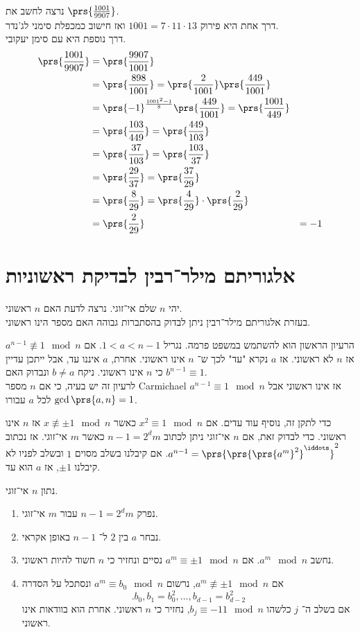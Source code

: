\documentclass[a4paper,10pt,twoside,openany]{book}
\begin{document}
\begin{example}
נרצה לחשב את
$\prs{\frac{1001}{9907}}$.\\
דרך אחת היא פירוק
$1001 = 7 \cdot 11 \cdot 13$
ואז חישוב כמכפלת סימני לג'נדר.
\\
דרך נוספת היא עם סימן יעקובי.
\begin{align*}
\prs{\frac{1001}{9907}} &= \prs{\frac{9907}{1001}} \\&= \prs{\frac{898}{1001}} =
\prs{\frac{2}{1001}}\prs{\frac{449}{1001}} \\&=
\prs{-1}^{\frac{1001^2 - 1}{8}} \prs{\frac{449}{1001}} =
\prs{\frac{1001}{449}} \\&=
\prs{\frac{103}{449}} =
\prs{\frac{449}{103}} \\&=
\prs{\frac{37}{103}} =
\prs{\frac{103}{37}} \\&=
\prs{\frac{29}{37}} =
\prs{\frac{37}{29}} \\&=
\prs{\frac{8}{29}} = \prs{\frac{4}{29}} \cdot \prs{\frac{2}{29}}\\&=
\prs{\frac{2}{29}} &= - 1
\end{align*}
\end{example}

\section{אלגוריתם מילר־רבין לבדיקת ראשוניות}

יהי
$n$
שלם אי־זוגי. נרצה לדעת האם
$n$
ראשוני.\\
בעזרת אלגוריתם מילר־רבין ניתן לבדוק בהסתברות גבוהה האם מספר הינו ראשוני.

הרעיון הראשון הוא להשתמש במשפט פרמה.
נגריל
$1 < a < n-1$.
אם
$a^{n-1} \not\equiv 1 \mod{n}$
אז
$n$
לא ראשוני.
אז
$a$
נקרא "עד" לכך ש־%
$n$
אינו ראשוני.
אחרת,
$a$
איננו עד, אבל ייתכן עדיין כי
$n$
אינו ראשוני.
ניקח
$b \neq a$
ונבדוק האם
$b^{n-1} \equiv 1$.\\
לרעיון זה יש בעיה, כי אם
$n$
מספר
\textenglish{Carmichael}
אז אינו ראשוני אבל
$a^{n-1} \equiv 1 \mod{n}$
לכל
$a$
עבורו
$\gcd\prs{a,n} = 1$.

כדי לתקן זה, נוסיף עוד עדים. אם
$x^2 \equiv 1 \mod{n}$
כאשר
$x \not\equiv \pm 1 \mod{n}$
אז
$n$
אינו ראשוני.
כדי לבדוק זאת, אם
$n$
אי־זוגי ניתן לכתוב
$n-1 = 2^d m$
כאשר
$m$
אי־זוגי. אז נכתוב
$a^{n-1} = \prs{\prs{\prs{a^m}^2}^{\iddots}}^2$.
אם קיבלנו בשלב מסוים
$1$
ובשלב לפניו לא קיבלנו
$\pm 1$,
אז
$a$
הוא עד.

\begin{algorithm}
נתון
$n$
אי־זוגי.
\begin{enumerate}
\item נפרק
$n-1 = 2^d m$
עבור
$m$
אי־זוגי.
\item נבחר
$a$
בין
$2$
ל־%
$n-1$
באופן אקראי.
\item נחשב
$a^m \mod {n}$.
אם
$a^m \equiv \pm 1 \mod{n}$
נסיים ונחזיר כי
$n$
חשוד להיות ראשוני.
\item אם
$a^m \not\equiv \pm 1 \mod{n}$,
נרשום
$a^m \equiv b_0 \mod{n}$
ונסתכל על הסדרה
\[\text{.} b_0, b_1 = b_0^2 , \ldots , b_{d-1} = b_{d-2}^2\]
אם בשלב ה־
$j$
כלשהו
$b_j \equiv -11 \mod{n}$,
נחזיר כי
$n$
ראשוני. אחרת הוא בוודאות אינו ראשוני.
\end{enumerate}
\end{algorithm}
\end{document}
